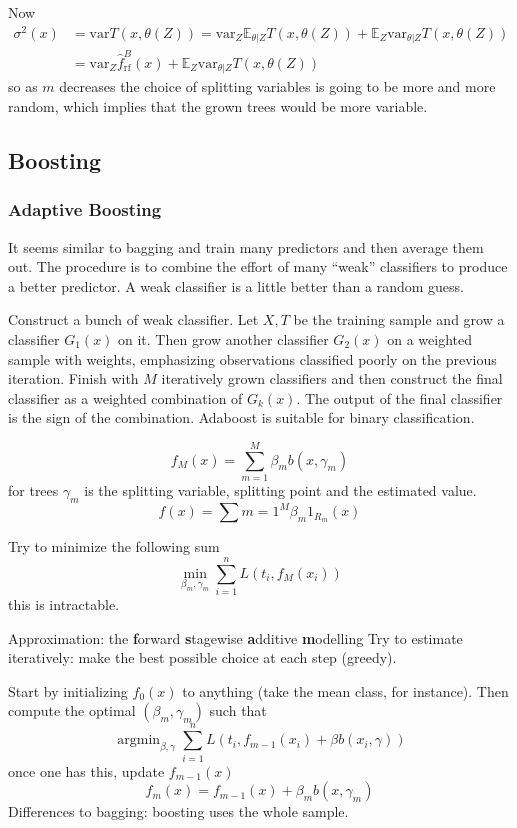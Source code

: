 \documentclass[a4paper]{article}
\newcommand{\ex}{\mathbb{E}}
\newcommand{\var}[0]{{\text{var}}}
\newcommand{\argmin}{\mathop{\text{argmin}}}
\begin{document}
Now
\begin{align*}
	\sigma^2(x)
	&= \var T(x,\theta(Z))
	= \var_Z \ex_{\theta|Z} T(x,\theta(Z)) + \ex_Z \var_{\theta|Z} T(x,\theta(Z)) \\
	&= \var_Z \hat{f}^B_{\text{rf}}(x) + \ex_Z \var_{\theta|Z} T(x,\theta(Z))
\end{align*}
so as $m$ decreases the choice of splitting variables is going to be more and more random,
which implies that the grown trees would be more variable.


\subsection{Boosting} %
\label{sub:boosting}

\subsubsection{\textbf{Ada}ptive \textbf{Boost}ing} %
\label{ssub:adaboost}

It seems similar to bagging and train many predictors and then average them out.
The procedure is to combine the effort of many ``weak'' classifiers to produce a
better predictor. A weak classifier is a little better than a random guess.

Construct a bunch of weak classifier. Let $X,T$ be the training sample and grow a
classifier $G_1(x)$ on it. Then grow another classifier $G_2(x)$ on a weighted sample
with weights, emphasizing observations classified poorly on the previous iteration.
Finish with $M$ iteratively grown classifiers and then construct the final classifier
as a weighted combination of $G_k(x)$. The output of the final classifier is the sign
of the combination. Adaboost is suitable for binary classification.

\[f_M(x) = \sum_{m=1}^M \beta_m b(x,\gamma_m)\]
for trees $\gamma_m$ is the splitting variable, splitting point and the estimated value.
\[f(x) = \sum{m=1}^M \beta_m 1_{R_m}(x)\]
 
Try to minimize the following sum
\[ \min_{\beta_m, \gamma_m} \sum_{i=1}^n L(t_i, f_M(x_i) ) \]
this is intractable.

Approximation: the \textbf{f}orward \textbf{s}tagewise \textbf{a}dditive \textbf{m}odelling
Try to estimate iteratively: make the best possible choice at each step (greedy).

Start by initializing $f_0(x)$ to anything (take the mean class, for instance).
Then compute the optimal $(\beta_m,\gamma_m)$ such that 
\[\argmin_{\beta, \gamma} \sum_{i=1}^n L(t_i,f_{m-1}(x_i) + \beta b(x_i, \gamma))\]
once one has this, update $f_{m-1}(x)$
\[
f_m(x) = f_{m-1}(x) + \beta_m b(x, \gamma_m)
\]
Differences to bagging: boosting uses the whole sample.
\end{document}

